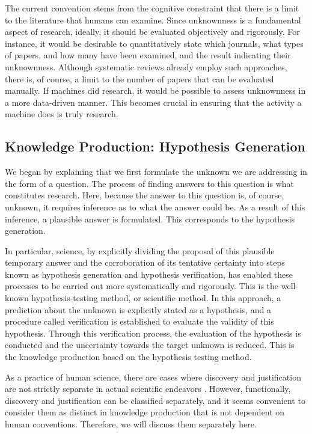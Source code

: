 \documentclass{book}
\begin{document}
The current convention stems from the cognitive constraint that there is a limit to the literature that humans can examine. Since unknownness is a fundamental aspect of research, ideally, it should be evaluated objectively and rigorously. For instance, it would be desirable to quantitatively state which journals, what types of papers, and how many have been examined, and the result indicating their unknownness. Although systematic reviews already employ such approaches, there is, of course, a limit to the number of papers that can be evaluated manually. If machines did research, it would be possible to assess unknownness in a more data-driven manner. This becomes crucial in ensuring that the activity a machine does is truly research.

\subsection{Knowledge Production: Hypothesis Generation}
We began by explaining that we first formulate the unknown we are addressing in the form of a question. The process of finding answers to this question is what constitutes research. Here, because the answer to this question is, of course, unknown, it requires inference as to what the answer could be. As a result of this inference, a plausible answer is formulated. This corresponds to the hypothesis generation.

In particular, science, by explicitly dividing the proposal of this plausible temporary answer and the corroboration of its tentative certainty into steps known as hypothesis generation and hypothesis verification, has enabled these processes to be carried out more systematically and rigorously. This is the well-known hypothesis-testing method, or scientific method. In this approach, a prediction about the unknown is explicitly stated as a hypothesis, and a procedure called verification is established to evaluate the validity of this hypothesis. Through this verification process, the evaluation of the hypothesis is conducted and the uncertainty towards the target unknown is reduced. This is the knowledge production based on the hypothesis testing method. 

As a practice of human science, there are cases where discovery and justification are not strictly separate in actual scientific endeavors \cite{arabatzis2006inextricability}. However, functionally, discovery and justification can be classified separately, and it seems convenient to consider them as distinct in knowledge production that is not dependent on human conventions. Therefore, we will discuss them separately here.
\end{document}
